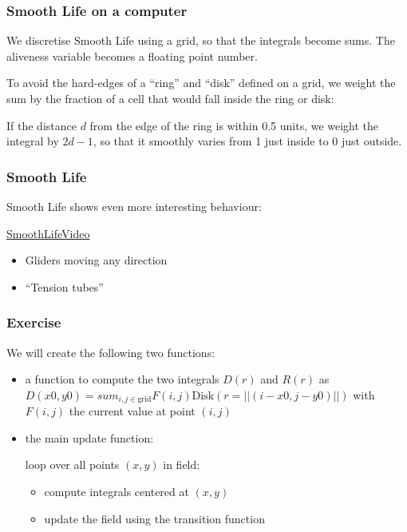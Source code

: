 \subsubsection{Smooth Life on a
computer}\label{smooth-life-on-a-computer}

We discretise Smooth Life using a grid, so that the integrals become
sums. The aliveness variable becomes a floating point number.

To avoid the hard-edges of a ``ring'' and ``disk'' defined on a grid, we
weight the sum by the fraction of a cell that would fall inside the ring
or disk:

If the distance $d$ from the edge of the ring is within 0.5 units, we
weight the integral by $2d-1$, so that it smoothly varies from 1 just
inside to 0 just outside.

\subsubsection{Smooth Life}\label{smooth-life-3}

Smooth Life shows even more interesting behaviour:

\href{https://www.youtube.com/watch?v=KJe9H6qS82I}{SmoothLifeVideo}

\begin{itemize}
\itemsep1pt\parskip0pt
\item
  Gliders moving any direction
\item
  ``Tension tubes''
\end{itemize}

\subsubsection{Exercise}\label{exercise-1}

We will create the following two functions:

\begin{itemize}
\item
  a function to compute the two integrals $D(r)$ and $R(r)$ as
  $D(x0, y0) = sum_{i, j \in \mathrm{grid}} F(i, j) \mathrm{Disk}(r=||(i - x0, j - y0)||)$
  with $F(i, j)$ the current value at point $(i, j)$
\item
  the main update function:

  loop over all points $(x, y)$ in field:

  \begin{itemize}
  \itemsep1pt\parskip0pt
  \item
    compute integrals centered at $(x, y)$
  \item
    update the field using the transition function
  \end{itemize}
\end{itemize}

